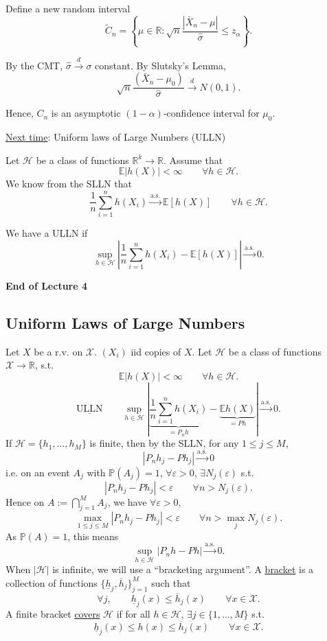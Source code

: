 \documentclass[11pt,a4paper]{article}
\begin{document}
\medskip
\noindent
Define a new random interval
\[
\widetilde{C}_n
=
\left\{
\mu\in\mathbb{R}:
\sqrt{n}\frac{|\bar{X}_n-\mu|}{\hat{\sigma}}
\leq z_\alpha
\right\}.
\]

\noindent
By the CMT, $\hat{\sigma}\xrightarrow{d}\sigma$ constant.
By Slutsky's Lemma,
\[
\sqrt{n}\frac{(\bar{X}_n-\mu_0)}{\hat{\sigma}}
\xrightarrow{d}N(0,1).
\]

\noindent
Hence, $C_n$ is an asymptotic $(1-\alpha)$-confidence interval
for $\mu_0$.

\medskip
\noindent
\underline{Next time}: Uniform laws of Large Numbers (ULLN)

\medskip
\noindent
Let $\mathcal{H}$ be a class of functions
$\mathbb{R}^k\to\mathbb{R}$.
Assume that
\[
\mathbb{E}|h(X)|<\infty
\qquad \forall h\in\mathcal{H}.
\]
We know from the SLLN that
\[
\frac{1}{n}\sum_{i=1}^n h(X_i)
\xrightarrow{\mathrm{a.s.}}
\mathbb{E}[h(X)]
\qquad \forall h\in\mathcal{H}.
\]

\noindent
We have a ULLN if
\[
\sup_{h\in\mathcal{H}}
\left|
\frac{1}{n}\sum_{i=1}^n h(X_i)-\mathbb{E}[h(X)]
\right|
\xrightarrow{\mathrm{a.s.}}0.
\]

\begin{center}
\textbf{End of Lecture 4}
\end{center}

\subsection*{Uniform Laws of Large Numbers}

Let $X$ be a r.v. on $\mathcal{X}$. $(X_i)$ iid copies of $X$.
Let $\mathcal{H}$ be a class of functions $\mathcal{X}\to\mathbb{R}$, s.t.
\[
\mathbb{E}|h(X)|<\infty\qquad\forall h\in\mathcal{H}.
\]
\[
\underline{\mathrm{ULLN}}\qquad
\sup_{h\in\mathcal{H}}\left|
\underbrace{\frac{1}{n}\sum_{i=1}^n h(X_i)}_{=P_nh}
-\underbrace{\mathbb{E}h(X)}_{=Ph}\right|
\xrightarrow{\mathrm{a.s.}}0.
\]
If $\mathcal{H}=\{h_1,\ldots,h_M\}$ is finite, then by the SLLN,
for any $1\leq j\leq M$,
\[
|P_nh_j-Ph_j|\xrightarrow{\mathrm{a.s.}}0
\]
i.e. on an event $A_j$ with $\mathbb{P}(A_j)=1$, $\forall\varepsilon>0$,
$\exists N_j(\varepsilon)$ s.t.
\[
|P_nh_j-Ph_j|<\varepsilon\qquad\forall n>N_j(\varepsilon).
\]
Hence on $A:=\bigcap_{j=1}^M A_j$, we have $\forall\varepsilon>0$,
\[
\max_{1\leq j\leq M}|P_nh_j-Ph_j|<\varepsilon
\qquad\forall n>\max_j N_j(\varepsilon).
\]
As $\mathbb{P}(A)=1$, this means
\[
\sup_{h\in\mathcal{H}}|P_nh-Ph|\xrightarrow{\mathrm{a.s.}}0.
\]
When $|\mathcal{H}|$ is infinite, we will use a ``bracketing argument''.
A \underline{bracket} is a collection of functions
$\{\underline{h}_j,\overline{h}_j\}_{j=1}^M$ such that
\[
\forall j,\qquad\underline{h}_j(x)\leq\overline{h}_j(x)
\qquad\forall x\in\mathcal{X}.
\]
A finite bracket \underline{covers} $\mathcal{H}$ if for all $h\in\mathcal{H}$,
$\exists j\in\{1,\ldots,M\}$ s.t.
\[
\underline{h}_j(x)\leq h(x)\leq\overline{h}_j(x)
\qquad\forall x\in\mathcal{X}.
\]
\end{document}
